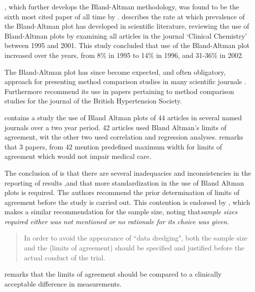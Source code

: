 \documentclass[12pt, a4paper]{report}
\theoremstyle{plain}
\theoremstyle{definition}
\theoremstyle{remark}
\begin{document}
\citet*{BA86}, which further develops the Bland-Altman methodology,
was found to be the sixth most cited paper of all time by \citet{BAcite}. \cite{Dewitte} describes the rate at which
prevalence of the Bland-Altman plot has developed in scientific
literature, reviewing the use of Bland-Altman plots
by examining all articles in the journal `Clinical Chemistry'
between 1995 and 2001. This study concluded that use of the
Bland-Altman plot increased over the years, from 8\% in 1995 to
14\% in 1996, and 31-36\% in 2002.

The Bland-Altman plot has since become expected, and
often obligatory, approach for presenting method comparison
studies in many scientific journals \citep{hollis}. Furthermore
\citet{BritHypSoc} recommend its use in papers pertaining to
method comparison studies for the journal of the British
Hypertension Society.


\citet{mantha} contains a study the use of Bland Altman plots of
44 articles in several named journals over a two year period. 42
articles used Bland Altman's limits of agreement, wit the other
two used correlation and regression analyses. \citet{mantha}
remarks that 3 papers, from 42 mention predefined maximum width
for limits of agreement which would not impair medical care.

The conclusion of \citet{mantha} is that there are several
inadequacies and inconsistencies in the reporting of results ,and
that more standardization in the use of Bland Altman plots is
required. The authors recommend the prior determination of limits
of agreement before the study is carried out. This contention is
endorsed by \citet{lin}, which makes a similar recommendation for
the sample size, noting that\emph{sample sizes required either was
	not mentioned or no rationale for its choice was given}.

\begin{quote}
	In order to avoid the appearance of ``data dredging", both the
	sample size and the (limits of agreement) should be specified and
	justified before the actual conduct of the trial. \citep{lin}
\end{quote}

\citet{Dewitte} remarks that the limits of agreement should be
compared to a clinically acceptable difference in measurements.
\end{document}
